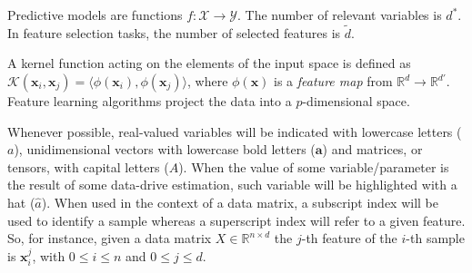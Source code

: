 Predictive models are functions $f: \mathcal{X} \rightarrow \mathcal{Y}$.
The number of relevant variables is $d^*$.
In feature selection tasks, the number of selected features is $\tilde d$.

A kernel function acting on the elements of the input space is defined as $\mathcal{K}(\bm{x}_{i},\bm{x}_{j})=\langle \phi(\bm{x}_{i}), \phi(\bm{x}_{j})\rangle$, where $\phi(\bm{x})$ is a {\em feature map} from $\mathds{R}^d \rightarrow \mathds{R}^{d'}$.
Feature learning algorithms project the data into a $p$-dimensional space.

Whenever possible,
real-valued variables will be indicated with lowercase letters (\eg $a$),
unidimensional vectors with lowercase bold letters (\eg $\bm{a}$) and
matrices, or tensors, with capital letters (\eg $A$).
When the value of some variable/parameter is the result of some data-drive estimation, such variable will be highlighted with a hat (\eg $\hat a$).
When used in the context of a data matrix, a subscript index will be used to identify a sample whereas a superscript index will refer to a given feature.
So, for instance, given a data matrix $X \in \mathbb{R}^{n \times d}$ the $j$-th feature of the $i$-th sample is $\bm{x}_i^j$, with $0 \leq i \leq n$ and $0\leq j\leq d$.
